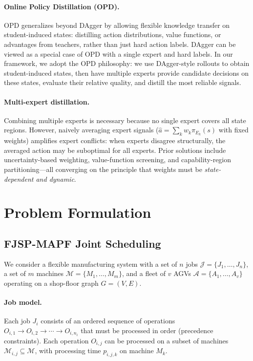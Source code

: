 \documentclass[11pt,a4paper]{article}
\begin{document}
\paragraph{Online Policy Distillation (OPD).}
OPD generalizes beyond DAgger by allowing flexible knowledge transfer on student-induced states: distilling action distributions, value functions, or advantages from teachers, rather than just hard action labels. DAgger can be viewed as a special case of OPD with a single expert and hard labels. In our framework, we adopt the OPD philosophy: we use DAgger-style rollouts to obtain student-induced states, then have multiple experts provide candidate decisions on these states, evaluate their relative quality, and distill the most reliable signals.

\paragraph{Multi-expert distillation.}
Combining multiple experts is necessary because no single expert covers all state regions. However, naively averaging expert signals ($\hat{a} = \sum_k w_k \pi_{E_k}(s)$ with fixed weights) amplifies expert conflicts: when experts disagree structurally, the averaged action may be suboptimal for all experts. Prior solutions include uncertainty-based weighting, value-function screening, and capability-region partitioning---all converging on the principle that weights must be \emph{state-dependent and dynamic}.


\section{Problem Formulation}
\label{sec:problem}

\subsection{FJSP-MAPF Joint Scheduling}

We consider a flexible manufacturing system with a set of $n$ jobs $\mathcal{J} = \{J_1, \ldots, J_n\}$, a set of $m$ machines $\mathcal{M} = \{M_1, \ldots, M_m\}$, and a fleet of $v$ AGVs $\mathcal{A} = \{A_1, \ldots, A_v\}$ operating on a shop-floor graph $G = (V, E)$.

\paragraph{Job model.}
Each job $J_i$ consists of an ordered sequence of operations $O_{i,1} \rightarrow O_{i,2} \rightarrow \cdots \rightarrow O_{i,n_i}$ that must be processed in order (precedence constraints). Each operation $O_{i,j}$ can be processed on a subset of machines $\mathcal{M}_{i,j} \subseteq \mathcal{M}$, with processing time $p_{i,j,k}$ on machine $M_k$.
\end{document}
